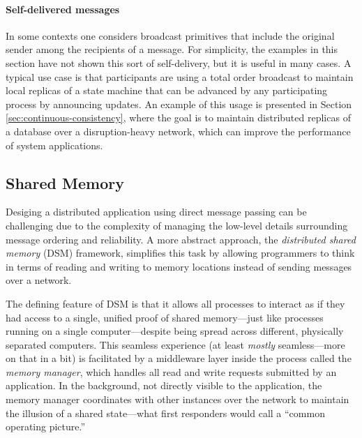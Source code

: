 \documentclass[]             %
{NASA}                       %
\theoremstyle{definition}
\begin{document}
\paragraph{Self-delivered messages}
In some contexts one considers broadcast primitives that include the
original sender among the recipients of a message. For simplicity, the
examples in this section have not shown this sort of self-delivery,
but it is useful in many cases. A typical use case is that
participants are using a total order broadcast to maintain local
replicas of a state machine that can be advanced by any participating
process by announcing updates. An example of this usage is presented
in Section \ref{sec:continuous-consistency}, where the goal is to
maintain distributed replicas of a database over a disruption-heavy
network, which can improve the performance of system applications.



\subsection{Shared Memory}
\label{ssec:shared-memory}
Desiging a distributed application using direct message passing can be
challenging due to the complexity of managing the low-level details
surrounding message ordering and reliability. A more abstract
approach, the \emph{distributed shared memory} (DSM) framework,
simplifies this task by allowing programmers to think in terms of
reading and writing to memory locations instead of sending messages
over a network.

The defining feature of DSM is that it allows all processes to
interact as if they had access to a single, unified proof of shared
memory---just like processes running on a single computer---despite
being spread across different, physically separated computers.  This
seamless experience (at least \emph{mostly} seamless---more on that in
a bit) is facilitated by a middleware layer inside the process called
the \emph{memory manager}, which handles all read and write requests
submitted by an application. In the background, not directly visible
to the application, the memory manager coordinates with other
instances over the network to maintain the illusion of a shared
state---what first responders would call a ``common operating
picture.''
\end{document}
